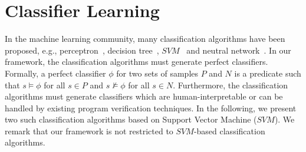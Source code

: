 \section{Classifier Learning}
In the machine learning community, many classification algorithms have been proposed, 
e.g., perceptron~\cite{perceptron}, decision tree~\cite{quinlan1986induction}, $\mathit{SVM}$~\cite{svm:original} and neutral network~\cite{nn}.
In our framework, the classification algorithms must generate perfect classifiers. 
Formally, a perfect classifier $\phi$ for two sets of samples $P$ and $N$ is a predicate such that $s \models \phi$ for all $\mathit{s \in P}$ and $\mathit{s \not \models \phi}$ for all $\mathit{s \in N}$. 
Furthermore, the classification algorithms must generate classifiers which are human-interpretable or can be handled by existing program verification techniques. 
In the following, we present two such classification algorithms based on Support Vector Machine ($\mathit{SVM}$). 
We remark that our framework is not restricted to $\mathit{SVM}$-based classification algorithms.
